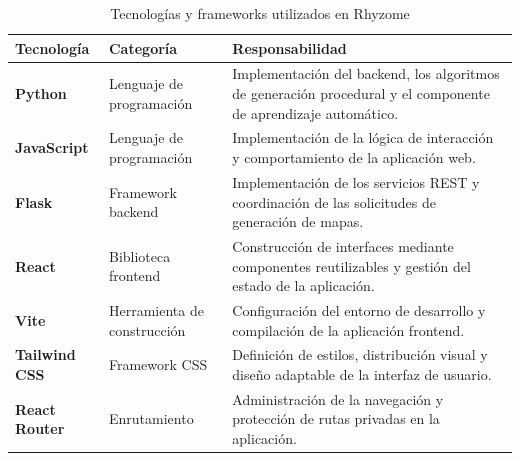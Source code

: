 \begin{table}[htbp]
	\centering
	
	\caption{Tecnologías y frameworks utilizados en Rhyzome}
	\label{tab:stack_tecnologico}
	
	\renewcommand{\arraystretch}{1.5}
	
	\begin{tabularx}{\textwidth}{
			|>{\raggedright\arraybackslash}p{2.8cm}|
			>{\raggedright\arraybackslash}p{2.8cm}|
			>{\raggedright\arraybackslash}X|
		}
		\hline
		
		\rowcolor{gray!15}
		\textbf{Tecnología} &
		\textbf{Categoría} &
		\textbf{Responsabilidad} \\
		
		\hline
		
		\textbf{Python} &
		Lenguaje de programación &
		Implementación del backend, los algoritmos de generación procedural y el componente de aprendizaje automático. \\
		
		\hline
		
		\textbf{JavaScript} &
		Lenguaje de programación &
		Implementación de la lógica de interacción y comportamiento de la aplicación web. \\
		
		\hline
		
		\textbf{Flask} &
		Framework backend &
		Implementación de los servicios REST y coordinación de las solicitudes de generación de mapas. \\
		
		\hline
		
		\textbf{React} &
		Biblioteca frontend &
		Construcción de interfaces mediante componentes reutilizables y gestión del estado de la aplicación. \\
		
		\hline
		
		\textbf{Vite} &
		Herramienta de construcción &
		Configuración del entorno de desarrollo y compilación de la aplicación frontend. \\
		
		\hline
		
		\textbf{Tailwind CSS} &
		Framework CSS &
		Definición de estilos, distribución visual y diseño adaptable de la interfaz de usuario. \\
		
		\hline
		
		\textbf{React Router} &
		Enrutamiento &
		Administración de la navegación y protección de rutas privadas en la aplicación. \\
		

\end{tabularx}
\end{table}
